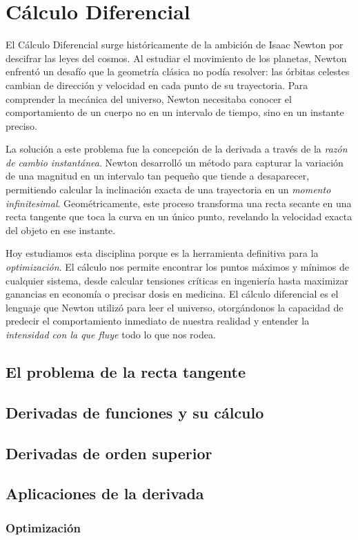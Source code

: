 \section{Cálculo Diferencial}

El Cálculo Diferencial surge históricamente de la ambición de Isaac Newton por descifrar las leyes del cosmos. Al estudiar el movimiento de los planetas, Newton enfrentó un desafío que la geometría clásica no podía resolver: las órbitas celestes cambian de dirección y velocidad en cada punto de su trayectoria. Para comprender la mecánica del universo, Newton necesitaba conocer el comportamiento de un cuerpo no en un intervalo de tiempo, sino en un instante preciso.

La solución a este problema fue la concepción de la derivada a través de la \emph{razón de cambio instantánea}. Newton desarrolló un método para capturar la variación de una magnitud en un intervalo tan pequeño que tiende a desaparecer, permitiendo calcular la inclinación exacta de una trayectoria en un \emph{momento infinitesimal}. Geométricamente, este proceso transforma una recta secante en una recta tangente que toca la curva en un único punto, revelando la velocidad exacta del objeto en ese instante.

Hoy estudiamos esta disciplina porque es la herramienta definitiva para la \emph{optimización}. El cálculo nos permite encontrar los puntos máximos y mínimos de cualquier sistema, desde calcular tensiones críticas en ingeniería hasta maximizar ganancias en economía o precisar dosis en medicina. El cálculo diferencial es el lenguaje que Newton utilizó para leer el universo, otorgándonos la capacidad de predecir el comportamiento inmediato de nuestra realidad y entender la \emph{intensidad con la que fluye} todo lo que nos rodea.

\subsection{El problema de la recta tangente}

\subsection{Derivadas de funciones y su cálculo}

\subsection{Derivadas de orden superior}

\subsection{Aplicaciones de la derivada}

\subsubsection{Optimización}
